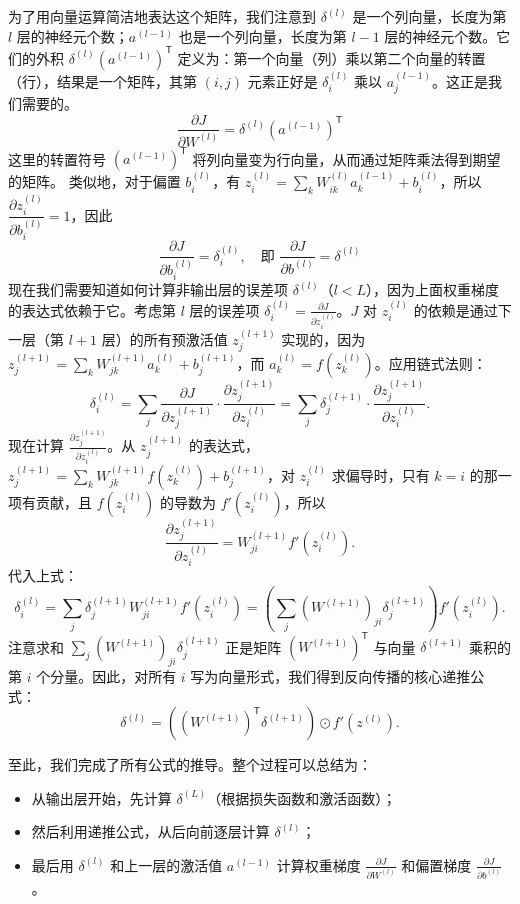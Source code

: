 \documentclass[lang=cn,zihao=-4,a4paper,fontset=windows]{beautybook}
\renewcommand{\partial}{∂}
\begin{document}
为了用向量运算简洁地表达这个矩阵，我们注意到 $\delta^{(l)}$ 是一个列向量，长度为第 $l$ 层的神经元个数；$a^{(l-1)}$ 也是一个列向量，长度为第 $l-1$ 层的神经元个数。它们的外积 $\delta^{(l)} (a^{(l-1)})^{\mathsf{T}}$ 定义为：第一个向量（列）乘以第二个向量的转置（行），结果是一个矩阵，其第 $(i,j)$ 元素正好是 $\delta_i^{(l)}$ 乘以 $a_j^{(l-1)}$。这正是我们需要的。
\[\frac{\partial J}{\partial W^{(l)}} = \delta^{(l)} (a^{(l-1)})^{\mathsf{T}}\]
这里的转置符号 $(a^{(l-1)})^{\mathsf{T}}$ 将列向量变为行向量，从而通过矩阵乘法得到期望的矩阵。
类似地，对于偏置 $b_i^{(l)}$，有 $z_i^{(l)} = \sum_k W_{ik}^{(l)} a_k^{(l-1)} + b_i^{(l)}$，所以 $\dfrac{\partial z_i^{(l)}}{\partial b_i^{(l)}} = 1$，因此
\[\frac{\partial J}{\partial b_i^{(l)}} = \delta_i^{(l)}, \quad \text{即 } \frac{\partial J}{\partial b^{(l)}} = \delta^{(l)}\]
现在我们需要知道如何计算非输出层的误差项 $\delta^{(l)}$（$l < L$），因为上面权重梯度的表达式依赖于它。考虑第 $l$ 层的误差项 $\delta_i^{(l)} = \frac{\partial J}{\partial z_i^{(l)}}$。$J$ 对 $z_i^{(l)}$ 的依赖是通过下一层（第 $l+1$ 层）的所有预激活值 $z_j^{(l+1)}$ 实现的，因为 $z_j^{(l+1)} = \sum_k W_{jk}^{(l+1)} a_k^{(l)} + b_j^{(l+1)}$，而 $a_k^{(l)} = f(z_k^{(l)})$。应用链式法则：
\[
\delta_i^{(l)} = \sum_j \frac{\partial J}{\partial z_j^{(l+1)}} \cdot \frac{\partial z_j^{(l+1)}}{\partial z_i^{(l)}} = \sum_j \delta_j^{(l+1)} \cdot \frac{\partial z_j^{(l+1)}}{\partial z_i^{(l)}}.
\]
现在计算 $\frac{\partial z_j^{(l+1)}}{\partial z_i^{(l)}}$。从 $z_j^{(l+1)}$ 的表达式，$z_j^{(l+1)} = \sum_k W_{jk}^{(l+1)} f(z_k^{(l)}) + b_j^{(l+1)}$，对 $z_i^{(l)}$ 求偏导时，只有 $k=i$ 的那一项有贡献，且 $f(z_i^{(l)})$ 的导数为 $f'(z_i^{(l)})$，所以
\[
\frac{\partial z_j^{(l+1)}}{\partial z_i^{(l)}} = W_{ji}^{(l+1)} f'(z_i^{(l)}).
\]
代入上式：
\[
\delta_i^{(l)} = \sum_j \delta_j^{(l+1)} W_{ji}^{(l+1)} f'(z_i^{(l)}) = \left( \sum_j (W^{(l+1)})_{ji} \delta_j^{(l+1)} \right) f'(z_i^{(l)}).
\]
注意求和 $\sum_j (W^{(l+1)})_{ji} \delta_j^{(l+1)}$ 正是矩阵 $(W^{(l+1)})^{\mathsf{T}}$ 与向量 $\delta^{(l+1)}$ 乘积的第 $i$ 个分量。因此，对所有 $i$ 写为向量形式，我们得到反向传播的核心递推公式：
\[
\boxed{\delta^{(l)} = \left( (W^{(l+1)})^{\mathsf{T}} \delta^{(l+1)} \right) \odot f'(z^{(l)}) }.
\]

至此，我们完成了所有公式的推导。整个过程可以总结为：
\begin{itemize}
    \item 从输出层开始，先计算 $\delta^{(L)}$（根据损失函数和激活函数）；
    \item 然后利用递推公式，从后向前逐层计算 $\delta^{(l)}$；
    \item 最后用 $\delta^{(l)}$ 和上一层的激活值 $a^{(l-1)}$ 计算权重梯度 $\frac{\partial J}{\partial W^{(l)}}$ 和偏置梯度 $\frac{\partial J}{\partial b^{(l)}}$。
\end{itemize}
\end{document}
